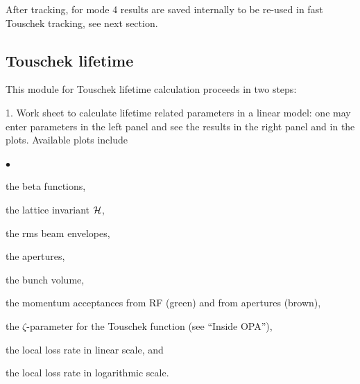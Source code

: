 \documentclass[12pt]{article}
\newenvironment{mylist}
  {\begin{list}{$\bullet$}{\parsep 0pt}}
  {\end{list}}
\begin{document}

After tracking, for mode 4 results are saved internally to be re-used in fast Touschek tracking, see next section.


\subsection{\label{ssecttt}Touschek lifetime}
This module for Touschek lifetime calculation proceeds in two steps:

1. Work sheet to calculate lifetime related
parameters in a linear model: one may enter parameters in the
left panel and see the results in the right panel and in the plots.
Available plots include
\begin{mylist}
\item the beta functions,
\item the lattice invariant ${\cal H}$,
\item the rms beam envelopes,
\item the apertures,
\item the bunch volume,
\item the momentum acceptances from RF (green) and from apertures (brown),
\item the $\zeta$-parameter for the Touschek function (see ``Inside OPA''),
\item the local loss rate in linear scale, and
\item the local loss rate in logarithmic scale.
\end{mylist}
\end{document}
